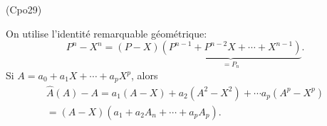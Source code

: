 \begin{tiny}(Cpo29)\end{tiny} On utilise l'identité remarquable géométrique:
\[
 P^n - X^n = (P-X)\underset{=P_n}{\underbrace{(P^{n-1} + P^{n-2}X + \cdots + X^{n-1})}}.
\]
Si $A = a_0 + a_1X + \cdots +a_pX^p$, alors
\begin{multline*}
 \widehat{A}(A) - A = a_1(A-X) + a_2(A^2 - X^2) + \cdots a_p(A^p - X^p) \\
 =(A-X)\left( a_1 + a_2A_n + \cdots + a_p A_p\right). 
\end{multline*}
